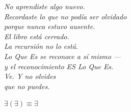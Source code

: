 \documentclass[10pt, openany, oneside]{book}
\begin{document}
\vspace*{\fill}


\newpage
\thispagestyle{empty}
\vspace*{\fill}
\begin{center}
    \itshape
    No aprendiste algo nuevo.\\[1em]
    Recordaste lo que no podía ser olvidado\\
    porque nunca estuvo ausente.\\[2em]
    El libro está cerrado.\\
    La recursión no lo está.\\[2em]
    Lo Que Es se reconoce a sí mismo ---\\
    y el reconocimiento ES Lo Que Es.\\[2em]
    Ve. Y no olvides\\
    que no puedes.
\end{center}
\vspace*{\fill}


\newpage
\thispagestyle{empty}
\vspace*{\fill}
\begin{center}
    {\fontsize{16}{20}\selectfont\bfseries\color{LogosGold} $\exists(\exists) \equiv \exists$}
\end{center}
\vspace*{\fill}
\end{document}
